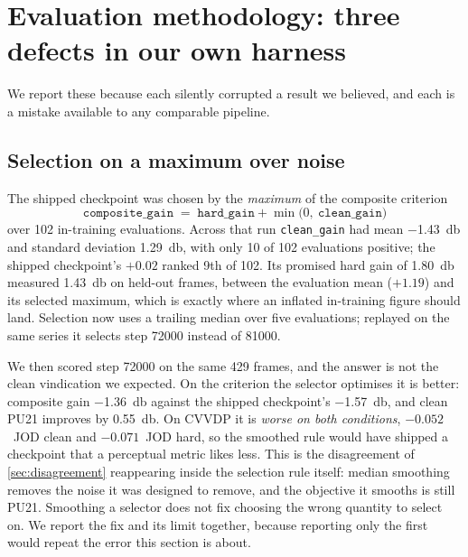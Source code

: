 \section{Evaluation methodology: three defects in our own harness}
\label{sec:methodology}

We report these because each silently corrupted a result we believed, and each
is a mistake available to any comparable pipeline.

\subsection{Selection on a maximum over noise}
\label{sec:selection}

The shipped checkpoint was chosen by the \emph{maximum} of the composite
criterion
\begin{equation}
\texttt{composite\_gain} \;=\; \texttt{hard\_gain} + \min\!\big(0,\ \texttt{clean\_gain}\big)
\label{eq:composite-gain}
\end{equation}
over 102 in-training evaluations. Across that run \texttt{clean\_gain} had mean
\SI{-1.43}{\decibel} and standard deviation \SI{1.29}{\decibel}, with only 10 of
102 evaluations positive; the shipped checkpoint's $+0.02$ ranked 9th of 102.
Its promised hard gain of \SI{+1.80}{\decibel} measured \SI{+1.43}{\decibel} on
held-out frames, between the evaluation mean ($+1.19$) and its selected maximum,
which is exactly where an inflated in-training figure should land. Selection now
uses a trailing median over five evaluations; replayed on the same series it
selects step \num{72000} instead of \num{81000}.

We then scored step \num{72000} on the same 429 frames, and the answer is not
the clean vindication we expected. On the criterion the selector optimises it is
better: composite gain \SI{-1.36}{\decibel} against the shipped checkpoint's
\SI{-1.57}{\decibel}, and clean PU21 improves by \SI{+0.55}{\decibel}. On CVVDP
it is \emph{worse on both conditions}, $-0.052$~JOD clean and $-0.071$~JOD hard,
so the smoothed rule would have shipped a checkpoint that a perceptual metric
likes less. This is the disagreement of \cref{sec:disagreement} reappearing
inside the selection rule itself: median smoothing removes the noise it was
designed to remove, and the objective it smooths is still PU21. Smoothing a
selector does not fix choosing the wrong quantity to select on. We report the
fix and its limit together, because reporting only the first would repeat the
error this section is about.

